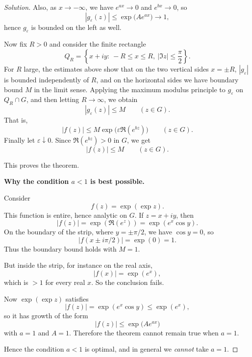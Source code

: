\documentclass[12pt, a4paper]{report}
\theoremstyle{spaced}
\begin{document}
\begin{proof}[Solution]
	Also, as \(x\to -\infty\), we have \(e^{ax}\to 0\) and \(e^{bx}\to 0\), so
	\[
		|g_\varepsilon(z)|\le \exp\!\bigl(Ae^{ax}\bigr)\to 1,
	\]
	hence \(g_\varepsilon\) is bounded on the left as well.

	Now fix \(R>0\) and consider the finite rectangle
	\[
		Q_R=\left\{x+iy:\ -R\le x\le R,\ |\Im z|\le \frac{\pi}{2}\right\}.
	\]
	For \(R\) large, the estimates above show that on the two vertical sides \(x=\pm R\), \(|g_\varepsilon|\) is bounded independently of \(R\), and on the horizontal sides we have boundary bound \(M\) in the limit sense. Applying the maximum modulus principle to \(g_\varepsilon\) on \(Q_R\cap G\), and then letting \(R\to\infty\), we obtain
	\[
		|g_\varepsilon(z)|\le M
		\qquad (z\in G).
	\]
	That is,
	\[
		|f(z)|\le M \exp\!\bigl(\varepsilon \Re(e^{bz})\bigr)
		\qquad (z\in G).
	\]
	Finally let \(\varepsilon\downarrow 0\). Since \(\Re(e^{bz})>0\) in \(G\), we get
	\[
		|f(z)|\le M
		\qquad (z\in G).
	\]

	This proves the theorem.

	\medskip
	\textbf{Why the condition \(a<1\) is best possible.}

	Consider
	\[
		f(z)=\exp(\exp z).
	\]
	This function is entire, hence analytic on \(G\). If \(z=x+iy\), then
	\[
		|f(z)|=\exp(\Re(e^z))=\exp(e^x\cos y).
	\]
	On the boundary of the strip, where \(y=\pm \pi/2\), we have \(\cos y=0\), so
	\[
		|f(x\pm i\pi/2)|=\exp(0)=1.
	\]
	Thus the boundary bound holds with \(M=1\).

	But inside the strip, for instance on the real axis,
	\[
		|f(x)|=\exp(e^x),
	\]
	which is \(>1\) for every real \(x\). So the conclusion fails.

	Now \(\exp(\exp z)\) satisfies
	\[
		|f(z)|=\exp(e^x\cos y)\le \exp(e^x),
	\]
	so it has growth of the form
	\[
		|f(z)|\le \exp\!\bigl(Ae^{ax}\bigr)
	\]
	with \(a=1\) and \(A=1\). Therefore the theorem cannot remain true when \(a=1\).

	Hence the condition \(a<1\) is optimal, and in general we \emph{cannot} take \(a=1\).
\end{proof}
\end{document}
